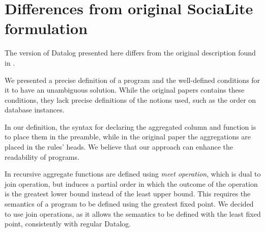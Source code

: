\section{Differences from original SociaLite formulation}

The version of Datalog presented here differs from the original description found in \cite{socialite, distsoc}.

We presented a precise definition of a \datalogra program and the well-defined conditions for it to have an unambiguous solution. While the original papers contains these conditions, they lack precise definitions of the notions used, such as the order on database instances.

In our definition, the syntax for declaring the aggregated column and function is to place them in the preamble, while in the original paper the aggregations are placed in the rules' heads. We believe that our approach can enhance the readability of \datalogra programs.

In \cite{socialite, distsoc} recursive aggregate functions are defined using \emph{meet operation}, which is dual to join operation, but induces a partial order in which the outcome of the operation is the greatest lower bound instead of the least upper bound. This requires the semantics of a program to be defined using the greatest fixed point. We decided to use join operations, as it allows the semantics to be defined with the least fixed point, consistently with regular Datalog.
